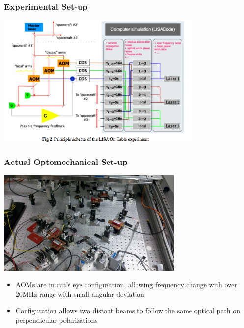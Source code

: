 \documentclass[notes, compressed, blue]{beamer}
\begin{document}
\begin{frame}
\frametitle{Experimental Set-up}

\begin{center}\includegraphics[width=4in]{principle.png}\end{center}

\end{frame}



\begin{frame}
\frametitle{Actual Optomechanical Set-up}

\begin{center}\includegraphics[width=3.6in]{optomechanical.jpg}\end{center}

\begin{itemize}
\item{AOMs are in cat's eye configuration, allowing frequency change with over 20MHz range with small angular deviation}
\item{Configuration allows two distant beams to follow the same optical path on perpendicular polarizations}
\end{itemize}

\end{frame}
\end{document}
